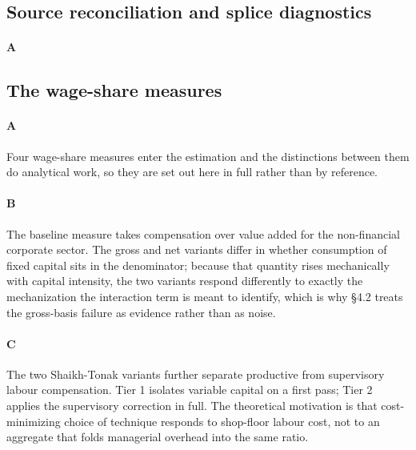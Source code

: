 \subsection{Source reconciliation and splice diagnostics}

\paragraph{A}

\subsection{The wage-share measures}

\paragraph{A}
Four wage-share measures enter the estimation and the distinctions between them do analytical work, so they are set out here in full rather than by reference.

\paragraph{B}
The baseline measure takes compensation over value added for the non-financial corporate sector. The gross and net variants differ in whether consumption of fixed capital sits in the denominator; because that quantity rises mechanically with capital intensity, the two variants respond differently to exactly the mechanization the interaction term is meant to identify, which is why §4.2 treats the gross-basis failure as evidence rather than as noise.

\paragraph{C}
The two Shaikh-Tonak variants further separate productive from supervisory labour compensation. Tier 1 isolates variable capital on a first pass; Tier 2 applies the supervisory correction in full. The theoretical motivation is that cost-minimizing choice of technique responds to shop-floor labour cost, not to an aggregate that folds managerial overhead into the same ratio.

